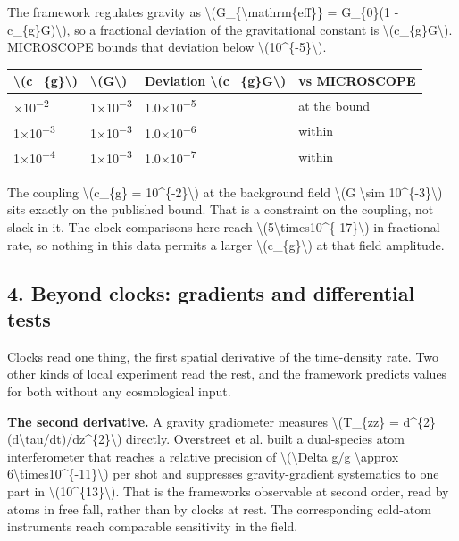 \documentclass[
  10pt,
]{article}
\begin{document}
The framework regulates gravity as
\textbackslash(G\_\{\textbackslash mathrm\{eff\}\} = G\_\{0\}(1 -
c\_\{g\}G)\textbackslash), so a fractional deviation of the
gravitational constant is \textbackslash(c\_\{g\}G\textbackslash).
MICROSCOPE bounds that deviation below
\textbackslash(10\^{}\{-5\}\textbackslash).

\begin{longtable}[]{@{}llll@{}}
\toprule\noalign{}
\textbackslash(c\_\{g\}\textbackslash) & \textbackslash(G\textbackslash)
& Deviation \textbackslash(c\_\{g\}G\textbackslash) & vs MICROSCOPE \\
\midrule\noalign{}
\endhead
\bottomrule\noalign{}
\endlastfoot
1×10\textsuperscript{−2} & 1×10\textsuperscript{−3} &
1.0×10\textsuperscript{−5} & at the bound \\
1×10\textsuperscript{−3} & 1×10\textsuperscript{−3} &
1.0×10\textsuperscript{−6} & within \\
1×10\textsuperscript{−4} & 1×10\textsuperscript{−3} &
1.0×10\textsuperscript{−7} & within \\
\end{longtable}

The coupling \textbackslash(c\_\{g\} = 10\^{}\{-2\}\textbackslash) at
the background field \textbackslash(G \textbackslash sim
10\^{}\{-3\}\textbackslash) sits exactly on the published bound. That is
a constraint on the coupling, not slack in it. The clock comparisons
here reach
\textbackslash(5\textbackslash times10\^{}\{-17\}\textbackslash) in
fractional rate, so nothing in this data permits a larger
\textbackslash(c\_\{g\}\textbackslash) at that field amplitude.

\hypertarget{beyond-clocks-gradients-and-differential-tests}{%
\subsection{4. Beyond clocks: gradients and differential
tests}\label{beyond-clocks-gradients-and-differential-tests}}

Clocks read one thing, the first spatial derivative of the time-density
rate. Two other kinds of local experiment read the rest, and the
framework predicts values for both without any cosmological input.

\textbf{The second derivative.} A gravity gradiometer measures
\textbackslash(T\_\{zz\} =
d\^{}\{2\}(d\textbackslash tau/dt)/dz\^{}\{2\}\textbackslash) directly.
Overstreet et al. built a dual-species atom interferometer that reaches
a relative precision of \textbackslash(\textbackslash Delta g/g
\textbackslash approx 6\textbackslash times10\^{}\{-11\}\textbackslash)
per shot and suppresses gravity-gradient systematics to one part in
\textbackslash(10\^{}\{13\}\textbackslash). That is the
framework\textquotesingle s observable at second order, read by atoms in
free fall, rather than by clocks at rest. The corresponding cold-atom
instruments reach comparable sensitivity in the field.
\end{document}
